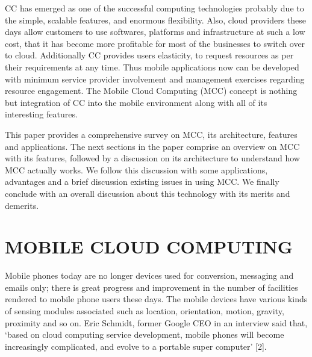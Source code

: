 \documentclass[10pt, conference, compsocconf]{IEEEtran}
\begin{document}

CC has emerged as one of the successful computing technologies probably due to the simple, scalable features, and enormous flexibility. Also, cloud providers these days allow customers to use softwares, platforms and infrastructure at such a low cost, that it has become more profitable for most of the businesses to switch over to cloud. Additionally CC provides users elasticity, to request resources as per their requirements at any time. Thus mobile applications now can be developed with minimum service provider involvement and management exercises regarding resource engagement. The Mobile Cloud Computing (MCC) concept is nothing but integration of CC into the mobile environment along with all of its interesting features.


This paper provides a comprehensive survey on MCC, its architecture, features and applications. The next sections in the paper comprise an overview on MCC with its features, followed by a discussion on its architecture to understand how MCC actually works. We follow this discussion with some applications, advantages and a brief discussion existing issues in using MCC. We finally conclude with an overall discussion about this technology with its merits and demerits.

\section{MOBILE CLOUD COMPUTING}
Mobile phones today are no longer devices used for conversion, messaging and emails only; there is great progress and improvement in the number of facilities rendered to mobile phone users these days. The mobile devices have various kinds of sensing modules associated such as location, orientation, motion, gravity, proximity and so on. Eric Schmidt, former Google CEO in an interview said that, `based on cloud computing service development, mobile phones will become increasingly complicated, and evolve to a portable super computer' [2].
\end{document}
